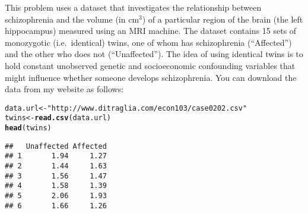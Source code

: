 \documentclass[addpoints,12pt]{exam}\usepackage[]{graphicx}\usepackage[]{color}
\makeatletter
\newcommand{\hlstr}[1]{\textcolor[rgb]{0.192,0.494,0.8}{#1}}%
\newcommand{\hlstd}[1]{\textcolor[rgb]{0.345,0.345,0.345}{#1}}%
\newcommand{\hlkwb}[1]{\textcolor[rgb]{0.69,0.353,0.396}{#1}}%
\newcommand{\hlkwd}[1]{\textcolor[rgb]{0.737,0.353,0.396}{\textbf{#1}}}%
\newenvironment{kframe}{%
 \def\at@end@of@kframe{}%
 \ifinner\ifhmode%
  \def\at@end@of@kframe{\end{minipage}}%
  \begin{minipage}{\columnwidth}%
 \fi\fi%
 \def\FrameCommand##1{\hskip\@totalleftmargin \hskip-\fboxsep
 \colorbox{shadecolor}{##1}\hskip-\fboxsep
     \hskip-\linewidth \hskip-\@totalleftmargin \hskip\columnwidth}%
 \MakeFramed {\advance\hsize-\width
   \@totalleftmargin\z@ \linewidth\hsize
   \@setminipage}}%
 {\par\unskip\endMakeFramed%
 \at@end@of@kframe}
\newenvironment{knitrout}{}{} %
\makeatother
\begin{document}
\begin{questions}
\question This problem uses a dataset that investigates the relationship between schizophrenia and the volume (in cm$^3$) of a particular region of the brain (the left hippocampus) measured using an MRI machine. The dataset contains 15 sets of monozygotic (i.e.\ identical) twins, one of whom has schizophrenia (``Affected'') and the other who does not (``Unaffected''). The idea of using identical twins is to hold constant unobserved genetic and socioeconomic confounding variables that might influence whether someone develops schizophrenia. You can download the data from my website as follows:
\begin{knitrout}
\color{fgcolor}\begin{kframe}
\begin{alltt}
\hlstd{data.url} \hlkwb{<-} \hlstr{"http://www.ditraglia.com/econ103/case0202.csv"}
\hlstd{twins} \hlkwb{<-} \hlkwd{read.csv}\hlstd{(data.url)}
\hlkwd{head}\hlstd{(twins)}
\end{alltt}
\begin{verbatim}
##   Unaffected Affected
## 1       1.94     1.27
## 2       1.44     1.63
## 3       1.56     1.47
## 4       1.58     1.39
## 5       2.06     1.93
## 6       1.66     1.26
\end{verbatim}
\end{kframe}
\end{knitrout}
\end{questions}
\end{document}

